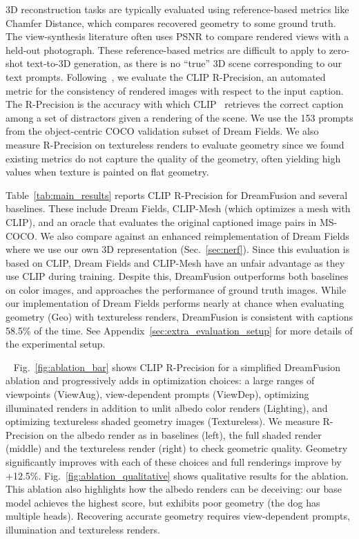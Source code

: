 \documentclass{article} \usepackage{iclr2023_conference,times}
\newcommand{\myparagraph}[1]{\noindent {\bf #1}\,\,\,}
\newcommand{\dreamfusion}{DreamFusion\xspace}
\begin{document}
3D reconstruction tasks are typically evaluated using reference-based metrics like Chamfer Distance, which compares recovered geometry to some ground truth. The view-synthesis literature often uses PSNR to compare rendered views with a held-out photograph. These reference-based metrics are difficult to apply to zero-shot text-to-3D generation, as there is no ``true'' 3D scene corresponding to our text prompts. Following~\citet{jain2021dreamfields}, we evaluate the CLIP R-Precision, an automated metric for the consistency of rendered images with respect to the input caption. The R-Precision is the accuracy with which CLIP~\citep{clip} retrieves the correct caption among a set of distractors given a rendering of the scene. We use the 153 prompts from the object-centric COCO validation subset of Dream Fields. We also measure R-Precision on textureless renders to evaluate geometry since we found existing metrics do not capture the quality of the geometry, often yielding high values when texture is painted on flat geometry.


Table~\ref{tab:main_results} reports CLIP R-Precision for \dreamfusion{} and several baselines. These include Dream Fields, CLIP-Mesh (which optimizes a mesh with CLIP), and an oracle that evaluates the original captioned image pairs in MS-COCO.
We also compare against an enhanced reimplementation of Dream Fields where we use our own 3D representation (Sec.~\ref{sec:nerf}). Since this evaluation is based on CLIP, Dream Fields and CLIP-Mesh have an unfair advantage as they use CLIP during training. Despite this, \dreamfusion outperforms both baselines on color images, and approaches the performance of ground truth images. While our implementation of Dream Fields performs nearly at chance when evaluating geometry (Geo) with textureless renders, \dreamfusion is consistent with captions 58.5\% of the time. See Appendix~\ref{sec:extra_evaluation_setup} for more details of the experimental setup.

\myparagraph{Ablations.} Fig.~\ref{fig:ablation_bar} shows CLIP R-Precision for a simplified \dreamfusion ablation and progressively adds in optimization choices: a large ranges of viewpoints (ViewAug), view-dependent prompts (ViewDep), optimizing illuminated renders in addition to unlit albedo color renders (Lighting), and optimizing textureless shaded geometry images (Textureless). We measure R-Precision on the albedo render as in baselines (left), the full shaded render (middle) and the textureless render (right) to check geometric quality. Geometry significantly improves with each of these choices and full renderings improve by +12.5\%. Fig.~\ref{fig:ablation_qualitative} shows qualitative results for the ablation. This ablation also highlights how the albedo renders can be deceiving: our base model achieves the highest score, but exhibits poor geometry (the dog has multiple heads). Recovering accurate geometry requires view-dependent prompts, illumination and textureless renders.
\end{document}
